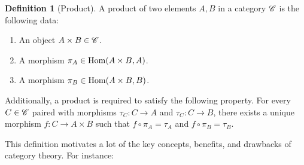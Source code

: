 \documentclass{article}
\theoremstyle{definition}
\newtheorem*{definition}{Definition}
\numberwithin{figure}{section}
\begin{document}
\begin{definition}[Product] A product of two elements $A,B$ in a category $\mathscr{C}$ is the following data:

\begin{enumerate}
\item An object $A\times B\in \mathscr{C}$.
\item A morphism $\pi_A\in \mathrm{Hom}(A\times B,A)$.
\item A morphism $\pi_B\in \mathrm{Hom}(A\times B,B)$.
\end{enumerate}

Additionally, a product is required to satisfy the following property. For every $C\in \mathscr{C}$ paired with morphisms $\tau_C: C\to A$ and $\tau_C: C\to B$, there exists a unique morphism $f: C\to A\times B$ such that $f\circ \pi_A=\tau_A$ and $f\circ \pi_B = \tau_B$.

\raggedleft\qedsymbol{}
\end{definition}

This definition motivates a lot of the key concepts, benefits, and drawbacks of category theory. For instance:
\end{document}
